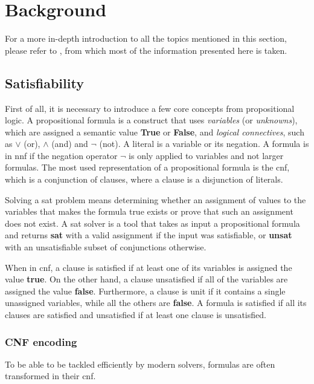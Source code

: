 \chapter{Background}

For a more in-depth introduction to all the topics mentioned in this section, please refer to \cite{book:handbook-sat,paper:survey-smt,book:lp}, from which most of the information presented here is taken.

\section{Satisfiability}

First of all, it is necessary to introduce a few core concepts from propositional logic.
A propositional formula is a construct that uses \textit{variables} (or \textit{unknowns}), which are assigned a semantic value \textbf{True} or \textbf{False}, and \textit{logical connectives}, such as $\lor$ (or), $\land$ (and) and $\neg$ (not).
A literal is a variable or its negation.
A formula is in \gls{nnf} if the negation operator $\neg$ is only applied to variables and not larger formulas.
The most used representation of a propositional formula is the \gls{cnf}, which is a conjunction of clauses, where a clause is a disjunction of literals.

Solving a \gls{sat} problem means determining whether an assignment of values to the variables that makes the formula true exists or prove that such an assignment does not exist.
A \gls{sat} solver is a tool that takes as input a propositional formula and returns \textbf{sat} with a valid assignment if the input was satisfiable, or \textbf{unsat} with an unsatisfiable subset of conjunctions otherwise.

When in \gls{cnf}, a clause is satisfied if at least one of its variables is assigned the value \textbf{true}.
On the other hand, a clause unsatisfied if all of the variables are assigned the value \textbf{false}.
Furthermore, a clause is unit if it contains a single unassigned variables, while all the others are \textbf{false}.
A formula is satisfied if all its clauses are satisfied and unsatisfied if at least one clause is unsatisfied.

\subsection*{CNF encoding}

To be able to be tackled efficiently by modern solvers, formulas are often transformed in their \gls{cnf}.

